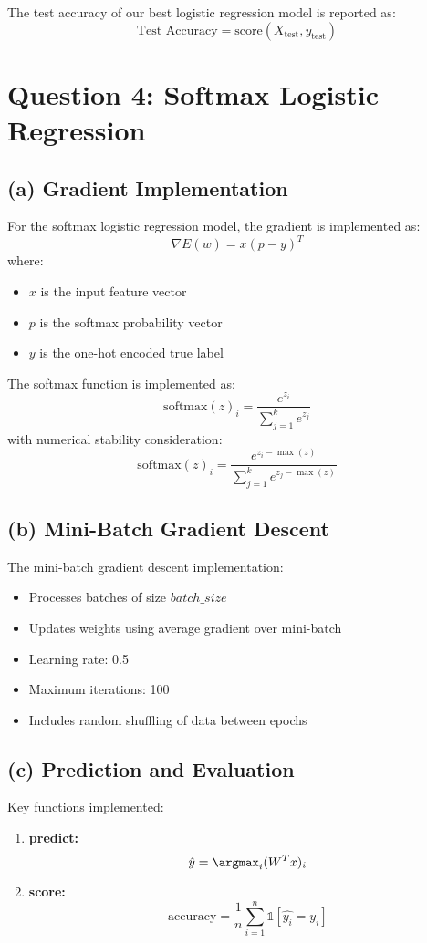 \documentclass{article}
\begin{document}
The test accuracy of our best logistic regression model is reported as:
\begin{equation*}
\text{Test Accuracy} = \text{score}(X_{\text{test}}, y_{\text{test}})
\end{equation*}

\section*{Question 4: Softmax Logistic Regression}

\subsection*{(a) Gradient Implementation}
For the softmax logistic regression model, the gradient is implemented as:
\[
\nabla E(w) = x(p - y)^T
\]
where:
\begin{itemize}
    \item $x$ is the input feature vector
    \item $p$ is the softmax probability vector
    \item $y$ is the one-hot encoded true label
\end{itemize}

The softmax function is implemented as:
\[
\text{softmax}(z)_i = \frac{e^{z_i}}{\sum_{j=1}^k e^{z_j}}
\]
with numerical stability consideration:
\[
\text{softmax}(z)_i = \frac{e^{z_i - \max(z)}}{\sum_{j=1}^k e^{z_j - \max(z)}}
\]

\subsection*{(b) Mini-Batch Gradient Descent}
The mini-batch gradient descent implementation:
\begin{itemize}
    \item Processes batches of size $batch\_size$
    \item Updates weights using average gradient over mini-batch
    \item Learning rate: 0.5
    \item Maximum iterations: 100
    \item Includes random shuffling of data between epochs
\end{itemize}

\subsection*{(c) Prediction and Evaluation}
Key functions implemented:
\begin{enumerate}
    \item \textbf{predict:}
    \[
    \hat{y} = \argmax_{i} (W^T x)_i
    \]

    \item \textbf{score:}
    \[
    \text{accuracy} = \frac{1}{n}\sum_{i=1}^n \mathbb{1}[\hat{y_i} = y_i]
    \]
\end{enumerate}
\end{document}
